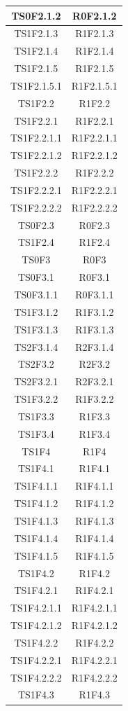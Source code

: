\begin{longtable}{|c|c|}
    	TS0F2.1.2&R0F2.1.2 \\ \hline
    	TS1F2.1.3&R1F2.1.3 \\ \hline
    	TS1F2.1.4&R1F2.1.4 \\ \hline
    	TS1F2.1.5&R1F2.1.5 \\ \hline
    	TS1F2.1.5.1&R1F2.1.5.1 \\ \hline
    	TS1F2.2&R1F2.2 \\ \hline
    	TS1F2.2.1&R1F2.2.1 \\ \hline
    	TS1F2.2.1.1&R1F2.2.1.1 \\ \hline
    	TS1F2.2.1.2&R1F2.2.1.2 \\ \hline
    	TS1F2.2.2&R1F2.2.2 \\ \hline
    	TS1F2.2.2.1&R1F2.2.2.1 \\ \hline
    	TS1F2.2.2.2&R1F2.2.2.2 \\ \hline
    	TS0F2.3&R0F2.3 \\ \hline
    	TS1F2.4&R1F2.4 \\ \hline
    	TS0F3&R0F3 \\ \hline
    	TS0F3.1&R0F3.1 \\ \hline
    	TS0F3.1.1&	R0F3.1.1 \\ \hline
    	TS1F3.1.2&R1F3.1.2 \\ \hline
    	TS1F3.1.3&R1F3.1.3 \\ \hline
    	TS2F3.1.4&R2F3.1.4 \\ \hline
    	TS2F3.2&R2F3.2 \\ \hline
    	TS2F3.2.1&R2F3.2.1 \\ \hline
    	TS1F3.2.2&R1F3.2.2 \\ \hline
    	TS1F3.3&R1F3.3 \\ \hline
    	TS1F3.4&R1F3.4\\ \hline
    	TS1F4&R1F4 \\ \hline
    	TS1F4.1&R1F4.1 \\ \hline
    	TS1F4.1.1&R1F4.1.1 \\ \hline
    	TS1F4.1.2&R1F4.1.2 \\ \hline
    	TS1F4.1.3&R1F4.1.3 \\ \hline
    	TS1F4.1.4&R1F4.1.4 \\ \hline
    	TS1F4.1.5&R1F4.1.5 \\ \hline
    	TS1F4.2&R1F4.2 \\ \hline
    	TS1F4.2.1&R1F4.2.1 \\ \hline
    	TS1F4.2.1.1&R1F4.2.1.1 \\ \hline
    	TS1F4.2.1.2&R1F4.2.1.2 \\ \hline
    	TS1F4.2.2&R1F4.2.2 \\ \hline
    	TS1F4.2.2.1&R1F4.2.2.1 \\ \hline
    	TS1F4.2.2.2&R1F4.2.2.2 \\ \hline
    	TS1F4.3&R1F4.3 \\ \hline
    	

\end{longtable}
